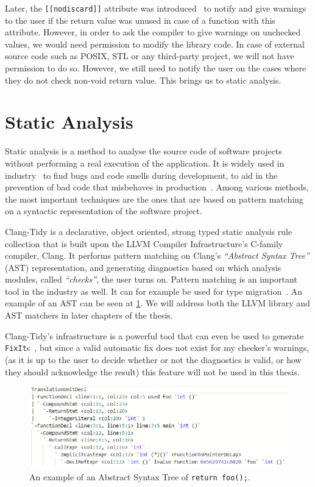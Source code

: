 Later, the \texttt{[[nodiscard]]} attribute was introduced~\cite{cppreferencenodiscard} to notify and give warnings to
the user if the return value was unused in case of a function
with this attribute. However, in order to ask the compiler to give warnings on unchecked values, we would need permission to modify the library code.
In case of external source code such as POSIX, STL or any third-party project, we will not have permission to do so.
However, we still need to notify the user on the cases where they do not check non-void return value. This brings us to static analysis.

\section{Static Analysis}

Static analysis is a method to analyse the source code of software projects without performing a real execution of the application.
It is widely used in industry~\cite{statcompare}
to find bugs and code smells during development, to aid in the prevention of bad code that misbehaves in
production~\cite{selectiondef}.
Among various methods, the most important techniques are the ones that are based on pattern matching on a syntactic representation of
the software project.

Clang-Tidy is a declarative, object oriented, strong typed static analysis rule collection that is built upon the LLVM Compiler
Infrastructure's C-family compiler, Clang.
It performs pattern matching on Clang's \emph{``Abstract Syntax Tree''} (AST) representation, and generating diagnostics based on which
analysis modules, called \emph{``checks''}, the user turns on. Pattern matching is an important tool in the industry as well. It can for
example be used for type migration~\cite{typemig}. An example of an AST can be seen at \cref{fig:ast1}.
We will address both the LLVM library and AST matchers in later chapters of the thesis.

Clang-Tidy's infrastructure is a powerful tool that can even be used to generate \texttt{FixIt}s~\cite{autorefact}, but since a
valid automatic fix does not exist for my checker's warnings, (as it is up to the user to decide whether or not the diagnostics is
valid, or how they should acknowledge the result) this feature will not be used in this thesis.


\begin{figure}[H]
    \includegraphics[width=\linewidth]{images/return_foo_ast.png}
    \caption{An example of an Abstract Syntax Tree of \texttt{return foo();}.}
    \label{fig:ast1}
\end{figure}

